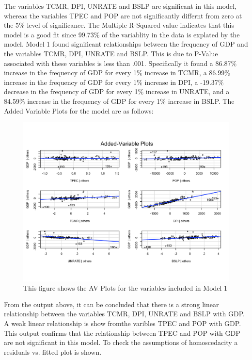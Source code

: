 \documentclass[12pt]{article}
\begin{document}
The variables TCMR, DPI, UNRATE and BSLP are significant in this model, whereas the variables TPEC and POP are not significantly differnt from zero at the 5\% level of significance.  
The Multiple R-Squared value indicates that this model is a good fit since 99.73\% of the variablity in the data is explated by the model. 
Model 1 found significant relationships between the frequency of GDP and the variables TCMR, DPI, UNRATE and BSLP. 
This is due to P-Value associated with these variables is less than .001. 
Specifically it found a 86.87\% increase in the frequency of GDP for every 1\% increase in TCMR, a 86.99\% increase in the frequency of GDP for every 1\% increase in DPI, a -19.37\% decrease in the frequency of GDP for every 1\% increase in UNRATE, and a 84.59\% increase in the frequency of GDP for every 1\% increase in BSLP.
The Added Variable Plots for the model are as follows:
\begin{figure}[H]
  \centering
  \includegraphics[scale = .35]{AVP1}
  \caption{This figure shows the AV Plots for the variables included in Model 1}
\end{figure}
From the output above, it can be concluded that there is a strong linear relationship between the variables TCMR, DPI, UNRATE and BSLP with GDP.
A weak linear relationship is show fromthe varibles TPEC and POP with GDP. 
This output confirms that the relationship between TPEC and POP with GDP are not significant in this model. 
To check the assumptions of homoscedacity a residuals vs. fitted plot is shown.
\end{document}
